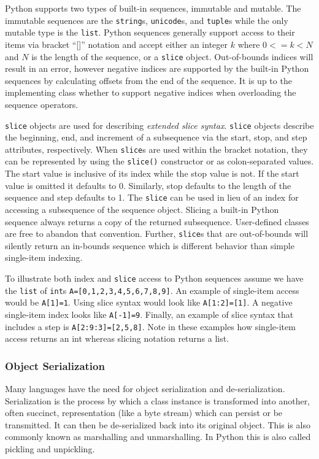 \documentclass{sigplanconf}
\begin{document}
Python supports two types of built-in sequences, immutable and mutable. The
immutable sequences are the \texttt{string}s, \texttt{unicode}s, and
\texttt{tuple}s while the only mutable type is the \texttt{list}. Python
sequences generally support access to their items via bracket “[]” notation
and accept either an integer $k$ where $0 <= k < N$ and $N$ is the length of
the sequence, or a \texttt{slice} object. Out-of-bounds indices will result in
an error, however negative indices are supported by the built-in Python
sequences by calculating offsets from the end of the sequence.  It is up to
the implementing class whether to support negative indices when overloading
the sequence operators.

\texttt{slice} objects are used for describing \emph{extended slice syntax}.
\texttt{slice} objects describe the beginning, end, and increment of a
subsequence via the start, stop, and step attributes, respectively. When
\texttt{slice}s are used within the bracket notation, they can be represented
by using the \texttt{slice()} constructor or as colon-separated values. The
start value is inclusive of its index while the stop value is not. If the
start value is omitted it defaults to 0. Similarly, stop defaults to the
length of the sequence and step defaults to 1. The \texttt{slice} can be used
in lieu of an index for accessing a subsequence of the sequence object.
Slicing a built-in Python sequence always returns a copy of the returned
subsequence. User-defined classes are free to abandon that convention.
Further, \texttt{slice}s that are out-of-bounds will silently return an
in-bounds sequence which is different behavior than simple single-item
indexing.

To illustrate both index and \texttt{slice} access to Python sequences assume
we have the \texttt{list} of \texttt{int}s \texttt{A=[0,1,2,3,4,5,6,7,8,9]}.
An example of single-item access would be \texttt{A[1]=1}. Using slice syntax
would look like \texttt{A[1:2]=[1]}. A negative single-item index looks like
\texttt{A[-1]=9}.  Finally, an example of slice syntax that includes a step is
\texttt{A[2:9:3]=[2,5,8]}.  Note in these examples how single-item access
returns an int whereas slicing notation returns a list.

\subsubsection{Object Serialization}

Many languages have the need for object serialization and de-serialization.
Serialization is the process by which a class instance is transformed into
another, often succinct, representation (like a byte stream) which can
persist or be transmitted. It can then be de-serialized back into its original
object. This is also commonly known as marshalling and unmarshalling. In
Python this is also called pickling and unpickling.
\end{document}
